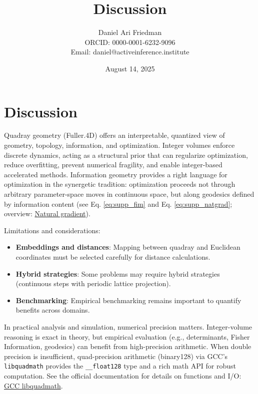 \documentclass[
  10pt,
]{article}
\title{Discussion}
\author{Daniel Ari Friedman\\ ORCID: 0000-0001-6232-9096\\ Email: daniel@activeinference.institute}
\date{August 14, 2025}
\providecommand{\tightlist}{%
  \setlength{\itemsep}{0pt}\setlength{\parskip}{0pt}}
\begin{document}
\maketitle

{
\hypersetup{linkcolor=red}
\setcounter{tocdepth}{3}
\tableofcontents
}
\hypertarget{discussion}{%
\section{Discussion}\label{discussion}}

Quadray geometry (Fuller.4D) offers an interpretable, quantized view of
geometry, topology, information, and optimization. Integer volumes
enforce discrete dynamics, acting as a structural prior that can
regularize optimization, reduce overfitting, prevent numerical
fragility, and enable integer-based accelerated methods. Information
geometry provides a right language for optimization in the synergetic
tradition: optimization proceeds not through arbitrary parameter-space
moves in continuous space, but along geodesics defined by information
content (see Eq. \eqref{eq:supp_fim} and Eq. \eqref{eq:supp_natgrad};
overview: \href{https://en.wikipedia.org/wiki/Natural_gradient}{Natural
gradient}).

Limitations and considerations:

\begin{itemize}
\tightlist
\item
  \textbf{Embeddings and distances}: Mapping between quadray and
  Euclidean coordinates must be selected carefully for distance
  calculations.
\item
  \textbf{Hybrid strategies}: Some problems may require hybrid
  strategies (continuous steps with periodic lattice projection).
\item
  \textbf{Benchmarking}: Empirical benchmarking remains important to
  quantify benefits across domains.
\end{itemize}

In practical analysis and simulation, numerical precision matters.
Integer-volume reasoning is exact in theory, but empirical evaluation
(e.g., determinants, Fisher Information, geodesics) can benefit from
high-precision arithmetic. When double precision is insufficient,
quad-precision arithmetic (binary128) via GCC's \texttt{libquadmath}
provides the \texttt{\_\_float128} type and a rich math API for robust
computation. See the official documentation for details on functions and
I/O: \href{https://gcc.gnu.org/onlinedocs/libquadmath/index.html}{GCC
libquadmath}.
\end{document}
